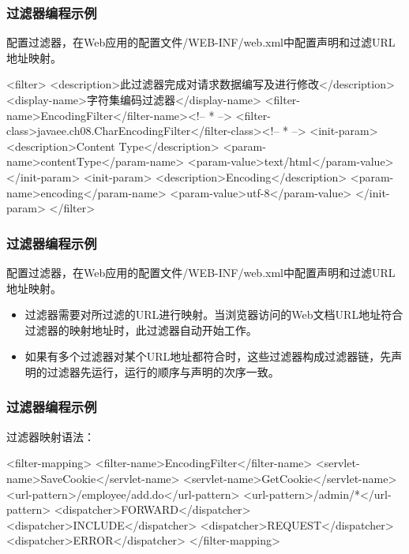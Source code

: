 \begin{frame}[fragile] %
\frametitle{过滤器编程示例} 

配置过滤器，在Web应用的配置文件/WEB-INF/web.xml中配置声明和过滤URL地址映射。

\begin{xmlCode}
<filter>
  <description>此过滤器完成对请求数据编写及进行修改</description>
  <display-name>字符集编码过滤器</display-name>
  <filter-name>EncodingFilter</filter-name><!-- * -->
  <filter-class>javaee.ch08.CharEncodingFilter</filter-class><!-- * -->
  <init-param>
    <description>Content Type</description>
    <param-name>contentType</param-name>
    <param-value>text/html</param-value>
  </init-param>
  <init-param>
    <description>Encoding</description>
    <param-name>encoding</param-name>
    <param-value>utf-8</param-value>
  </init-param>
</filter>
\end{xmlCode}
\end{frame}

\begin{frame}[fragile] %
\frametitle{过滤器编程示例} 

配置过滤器，在Web应用的配置文件/WEB-INF/web.xml中配置声明和过滤URL地址映射。


\begin{itemize}
\item 过滤器需要对所过滤的URL进行映射。当浏览器访问的Web文档URL地址符合过滤器的映射地址时，此过滤器自动开始工作。
\item 如果有多个过滤器对某个URL地址都符合时，这些过滤器构成过滤器链，先声明的过滤器先运行，运行的顺序与声明的次序一致。
\end{itemize}
\end{frame}

\begin{frame}[fragile] %
\frametitle{过滤器编程示例} 

过滤器映射语法：

\begin{xmlCode}
<filter-mapping>
  <filter-name>EncodingFilter</filter-name>
  <servlet-name>SaveCookie</servlet-name>
  <servlet-name>GetCookie</servlet-name>
  <url-pattern>/employee/add.do</url-pattern>
  <url-pattern>/admin/*</url-pattern>
  <dispatcher>FORWARD</dispatcher>
  <dispatcher>INCLUDE</dispatcher>
  <dispatcher>REQUEST</dispatcher>
  <dispatcher>ERROR</dispatcher>
</filter-mapping>
\end{xmlCode}
\end{frame}

